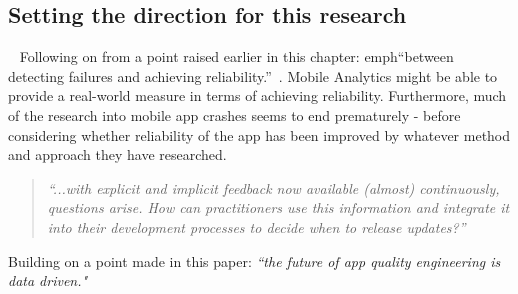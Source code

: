 \subsection{Setting the direction for this research}~\label{rw-setting-the-direction-for-this-research-topic}
Following on from a point raised earlier in this chapter: emph{``between detecting failures and achieving reliability.''}~. Mobile Analytics might be able to provide a real-world measure in terms of achieving reliability. Furthermore, much of the research into mobile app crashes seems to end prematurely - before considering whether reliability of the app has been improved by whatever method and approach they have researched.

\begin{quote}
    \emph{``...with explicit and implicit feedback now available (almost) continuously, questions arise. How can practitioners use this information and integrate it into their development processes to decide when to release updates?''}\cite[pp. 48-49]{maalej2016_towards_data_driven_requirements_engineering}    
\end{quote}

Building on a point made in this paper: \emph{``the future of app quality engineering is data driven."}~\cite[p. 24]{nagappan2016_future_trends_in_sw_eng_for_mobile_apps} %


